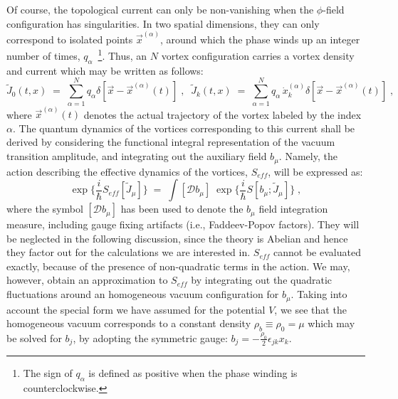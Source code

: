 \documentclass[a4paper,12pt]{article} \tolerance=200
\begin{document}
Of course, the topological current can only be non-vanishing when the
\mbox{$\phi$-field} configuration has singularities. In two spatial
dimensions, they can only correspond to isolated points ${\vec
x}^{(\alpha)}$, around which the phase winds up an integer number of
times, $q_\alpha$~\footnote{The sign of $q_\alpha$ is defined as
positive when the phase winding is counterclockwise.}.  Thus, an $N$
vortex configuration carries a vortex density and current which may be
written as follows:
\begin{equation}\label{eq:vcur}
{\tilde J}_0(t,x) \;=\; \sum_{\alpha =1}^N q_\alpha \delta [{\vec
x}-{\vec x}^{(\alpha)}(t)]\;,\;\; {\tilde J}_k(t,x) \;=\; \sum_{\alpha
=1}^N q_\alpha \, \dot{x}_k^{(\alpha)} \delta [{\vec x}-{\vec
x}^{(\alpha)}(t)] \;,
\end{equation}
where ${\vec x}^{(\alpha)}(t)$ denotes the actual trajectory of the
vortex labeled by the index $\alpha$.  The quantum dynamics of the
vortices corresponding to this current shall be derived by considering
the functional integral representation of the vacuum transition
amplitude, and integrating out the auxiliary field $b_\mu$. Namely,
the action describing the effective dynamics of the vortices,
$S_{eff}$, will be expressed as:
\begin{equation}\label{eq:defseff}
\exp\{\frac{i}{\hbar} S_{eff}[{\tilde J}_\mu]\}\;=\; \int [{\mathcal
D}b_\mu] \; \exp \{\frac{i}{\hbar} S[b_\mu; {\tilde J}_\mu]\} \;,
\end{equation}
where the symbol $[{\mathcal D}b_\mu]$ has been used to denote the
$b_\mu$ field integration measure, including gauge fixing artifacts
(i.e., Faddeev-Popov factors). They will be neglected in the following
discussion, since the theory is Abelian and hence they factor out for 
the calculations we are interested in.  $S_{eff}$ cannot be evaluated
exactly, because of the presence of non-quadratic terms in the action. 
We may, however, obtain an approximation to $S_{eff}$ by integrating 
out the quadratic fluctuations around an homogeneous vacuum 
configuration for $b_\mu$. Taking into account the special form we 
have assumed for the potential $V$, we see that the homogeneous 
vacuum corresponds to a constant density \mbox{$\rho_b \equiv \rho_0 = \mu$}
which may be solved for $b_j$, by adopting the symmetric gauge:
\mbox{$b_j = -\frac{\rho_0}{2} \epsilon_{jk} x_k$}.
\end{document}
